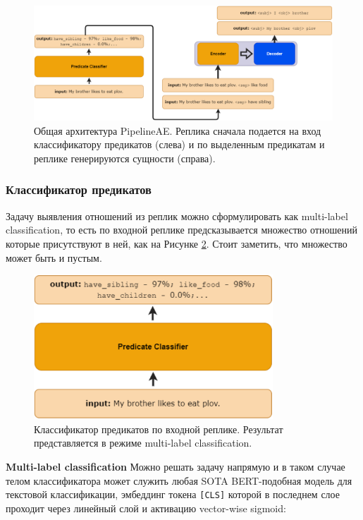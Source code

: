 \begin{figure}[!ht]
    \centering
    \includegraphics[width=1.0\textwidth]{images/full_arch.png}
    \caption{Общая архитектура PipelineAE. Реплика сначала подается на вход классификатору предикатов (слева) и по выделенным предикатам и реплике генерируются сущности (справа).}
    \label{fig:full_arch}
\end{figure}

\subsubsection{Классификатор предикатов}
Задачу выявления отношений из реплик можно сформулировать как multi-label classification, то есть по входной реплике предсказывается множество отношений которые присутствуют в ней, как на Рисунке \ref{fig:pred_cls}. Стоит заметить, что множество может быть и пустым.

\begin{figure}[!ht]
    \centering
    \includegraphics[width=0.8\textwidth]{images/pred_cls.png}
    \caption{Классификатор предикатов по входной реплике. Результат представляется в режиме multi-label classification.}
    \label{fig:pred_cls}
\end{figure}

\textbf{Multi-label classification} Можно решать задачу напрямую и в таком случае телом классификатора может служить любая SOTA BERT-подобная модель для текстовой классификации, эмбеддинг токена \texttt{[CLS]} которой в последнем слое проходит через линейный слой и активацию vector-wise sigmoid:

